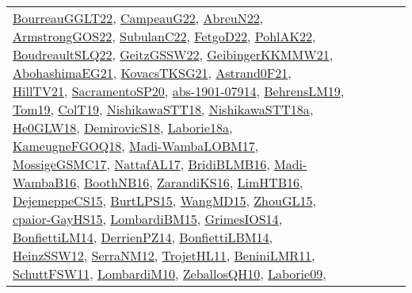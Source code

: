 {\begin{longtable}{lp{3cm}>{\raggedright}p{6cm}>{\raggedright}p{6cm}p{8cm}}
\href{articles/BourreauGGLT22.pdf}{BourreauGGLT22}\cite{BourreauGGLT22}, \href{articles/CampeauG22.pdf}{CampeauG22}\cite{CampeauG22}, \href{articles/AbreuN22.pdf}{AbreuN22}\cite{AbreuN22}, \href{papers/ArmstrongGOS22.pdf}{ArmstrongGOS22}\cite{ArmstrongGOS22}, \href{articles/SubulanC22.pdf}{SubulanC22}\cite{SubulanC22}, \href{articles/FetgoD22.pdf}{FetgoD22}\cite{FetgoD22}, \href{articles/PohlAK22.pdf}{PohlAK22}\cite{PohlAK22}, \href{papers/BoudreaultSLQ22.pdf}{BoudreaultSLQ22}\cite{BoudreaultSLQ22}, \href{papers/GeitzGSSW22.pdf}{GeitzGSSW22}\cite{GeitzGSSW22}, \href{papers/GeibingerKKMMW21.pdf}{GeibingerKKMMW21}\cite{GeibingerKKMMW21}, \href{articles/AbohashimaEG21.pdf}{AbohashimaEG21}\cite{AbohashimaEG21}, \href{papers/KovacsTKSG21.pdf}{KovacsTKSG21}\cite{KovacsTKSG21}, \href{papers/Astrand0F21.pdf}{Astrand0F21}\cite{Astrand0F21}, \href{papers/HillTV21.pdf}{HillTV21}\cite{HillTV21}, \href{articles/SacramentoSP20.pdf}{SacramentoSP20}\cite{SacramentoSP20}, \href{articles/abs-1901-07914.pdf}{abs-1901-07914}\cite{abs-1901-07914}, \href{papers/BehrensLM19.pdf}{BehrensLM19}\cite{BehrensLM19}, \href{papers/Tom19.pdf}{Tom19}\cite{Tom19}, \href{papers/ColT19.pdf}{ColT19}\cite{ColT19}, \href{papers/NishikawaSTT18.pdf}{NishikawaSTT18}\cite{NishikawaSTT18}, \href{papers/NishikawaSTT18a.pdf}{NishikawaSTT18a}\cite{NishikawaSTT18a}, \href{papers/He0GLW18.pdf}{He0GLW18}\cite{He0GLW18}, \href{papers/DemirovicS18.pdf}{DemirovicS18}\cite{DemirovicS18}, \href{papers/Laborie18a.pdf}{Laborie18a}\cite{Laborie18a}, \href{papers/KameugneFGOQ18.pdf}{KameugneFGOQ18}\cite{KameugneFGOQ18}, \href{papers/Madi-WambaLOBM17.pdf}{Madi-WambaLOBM17}\cite{Madi-WambaLOBM17}, \href{papers/MossigeGSMC17.pdf}{MossigeGSMC17}\cite{MossigeGSMC17}, \href{articles/NattafAL17.pdf}{NattafAL17}\cite{NattafAL17}, \href{articles/BridiBLMB16.pdf}{BridiBLMB16}\cite{BridiBLMB16}, \href{papers/Madi-WambaB16.pdf}{Madi-WambaB16}\cite{Madi-WambaB16}, \href{papers/BoothNB16.pdf}{BoothNB16}\cite{BoothNB16}, \href{articles/ZarandiKS16.pdf}{ZarandiKS16}\cite{ZarandiKS16}, \href{papers/LimHTB16.pdf}{LimHTB16}\cite{LimHTB16}, \href{papers/DejemeppeCS15.pdf}{DejemeppeCS15}\cite{DejemeppeCS15}, \href{papers/BurtLPS15.pdf}{BurtLPS15}\cite{BurtLPS15}, \href{articles/WangMD15.pdf}{WangMD15}\cite{WangMD15}, \href{papers/ZhouGL15.pdf}{ZhouGL15}\cite{ZhouGL15}, \href{papers/cpaior-GayHS15.pdf}{cpaior-GayHS15}\cite{cpaior-GayHS15}, \href{papers/LombardiBM15.pdf}{LombardiBM15}\cite{LombardiBM15}, \href{articles/GrimesIOS14.pdf}{GrimesIOS14}\cite{GrimesIOS14}, \href{papers/BonfiettiLM14.pdf}{BonfiettiLM14}\cite{BonfiettiLM14}, \href{papers/DerrienPZ14.pdf}{DerrienPZ14}\cite{DerrienPZ14}, \href{articles/BonfiettiLBM14.pdf}{BonfiettiLBM14}\cite{BonfiettiLBM14}, \href{articles/HeinzSSW12.pdf}{HeinzSSW12}\cite{HeinzSSW12}, \href{papers/SerraNM12.pdf}{SerraNM12}\cite{SerraNM12}, \href{articles/TrojetHL11.pdf}{TrojetHL11}\cite{TrojetHL11}, \href{articles/BeniniLMR11.pdf}{BeniniLMR11}\cite{BeniniLMR11}, \href{articles/SchuttFSW11.pdf}{SchuttFSW11}\cite{SchuttFSW11}, \href{papers/LombardiM10.pdf}{LombardiM10}\cite{LombardiM10}, \href{articles/ZeballosQH10.pdf}{ZeballosQH10}\cite{ZeballosQH10}, \href{papers/Laborie09.pdf}{Laborie09}\cite{Laborie09}, 
\end{longtable}}
